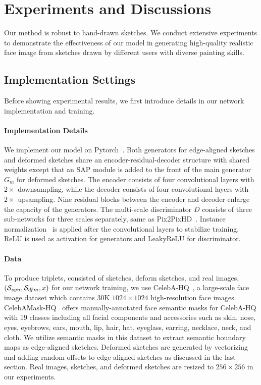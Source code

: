 \section{Experiments and Discussions}
\label{sec:experiments}

Our method is robust to hand-drawn sketches. We conduct extensive experiments to demonstrate the effectiveness of our model in generating high-quality realistic face image from sketches drawn by different users with diverse painting skills.  


\subsection{Implementation Settings}
Before showing experimental results, we first introduce details in our network implementation and training. 


\paragraph{Implementation Details}
We implement our model on Pytorch~\cite{Pytorch}. Both generators for edge-aligned sketches and deformed sketches share an encoder-residual-decoder structure with shared weights except that an SAP module is added to the front of the main generator $G_m$ for deformed sketches. 
The encoder consists of four convolutional layers with $2\times$ downsampling, while the decoder consists of four convolutional layers with $2\times$ upsampling. 
Nine residual blocks between the encoder and decoder enlarge the capacity of the generators. 
The multi-scale discriminator $D$ consists of three sub-networks for three scales separately, same as Pix2PixHD~\cite{pix2pixHD}. 
Instance normalization~\cite{IN} is applied after the convolutional layers to stabilize training. 
ReLU is used as activation for generators and LeakyReLU for discriminator. 
%
\paragraph{Data}
To produce triplets, consisted of sketches, deform sketches, and real images, $(\mathcal{S}_{syn}, \mathcal{S}_{dfm}, x)$ for our network training, we use 
CelebA-HQ~\cite{PGGAN}, a large-scale face image dataset which contains 30K $1024\times1024$ high-resolution face images. 
%
CelebAMask-HQ~\cite{CelebAMask-HQ} offers manually-annotated face semantic masks for CelebA-HQ with 19 classes including all facial components and accessories such as skin, nose, eyes, eyebrows, ears, mouth, lip, hair, hat, eyeglass, earring, necklace, neck, and cloth. We utilize semantic masks in this dataset to extract semantic boundary maps as edge-aligned sketches. 
Deformed sketches are generated by vectorizing and adding random offsets to edge-aligned sketches as discussed in the last section.
Real images, sketches, and deformed sketches are resized to $256\times256$ in our experiments.


